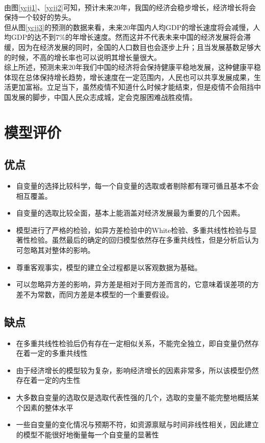 \documentclass[UTF8]{article}
\begin{document}
\newpage
~\\由图\ref{ycjj1}、\ref{ycjj2}可知，预计未来20年，我国的经济会稳步增长，经济增长将会保持一个较好的势头。
\\\indent \newpage 但从图\ref{ycjj3}的预测的数据来看，未来20年国内人均GDP的增长速度将会减慢，人均GDP的达不到7\%的年增长速度。然而这并不代表未来中国的经济发展将会滞缓，因为在经济发展的同时，全国的人口数目也会逐步上升；且当发展基数足够大的时候，不高的增长率也可以说明其增长量很大。
\\\indent
综上所述，预测未来20年我们中国的经济将会保持健康平稳地发展，这种健康平稳体现在总体保持增长趋势，增长速度在一定范围内，人民也可以共享发展成果，生活更加富裕。立足当下，虽然疫情不知道什么时候才能结束，但是疫情不会阻挡中国发展的脚步，中国人民众志成城，定会克服困难战胜疫情。

	\newpage
	\section{模型评价}
	\subsection{优点}
	\begin{itemize}
		\item 自变量的选择比较科学，每一个自变量的选取或者剔除都有理可循且基本不会相互覆盖。
		\item 自变量的选取比较全面，基本上能涵盖对经济发展最为重要的几个因素。
		\item 模型进行了严格的检验，如异方差检验中的White检验、多重共线性检验与显著性检验。虽然最后的确定的回归模型依然存在多重共线性，但是分析后认为可忽略其对整体的影响。
		\item 尊重客观事实，模型的建立全过程都是以客观数据为基础。
		\item 可以忽略异方差的影响，异方差是相对于同方差而言的，它意味着误差项的方差不为常数，而同方差是本模型的一个重要假设。
	\end{itemize}
	\subsection{缺点}
	\begin{itemize}
	\item 在多重共线性检验后仍有存在一定相似关系，不能完全独立，即自变量仍然存在着一定的多重共线性
	\item 由于经济增长的模型较为复杂，影响经济增长的因素非常多，所以该模型仍然存在着一定的内生性
	\item 大多数自变量的选取仅是选取代表性强的几个，选取的变量不能完整地概括某个因素的整体水平
	\item 一些自变量的变化情况与预期不符，如资源禀赋与时间非线性相关，因此建立的模型不能很好地衡量每一个自变量的显著性
	\end{itemize}
\end{document}
